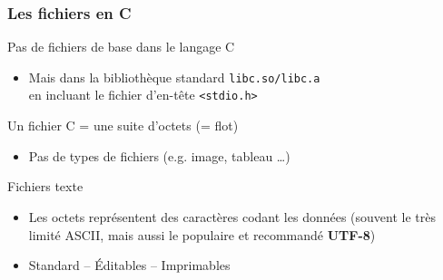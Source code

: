 \documentclass[table,handout,tikz,12pt,svgnames]{beamer}
\subtitle{\Huge Les Fichiers en C}
\date{CM5}
\begin{document}
\begin{frame}
	\titlepage
\end{frame}



\begin{frame}[fragile=singleslide]
	\frametitle{Les fichiers en C}
		\begin{block}{Pas de fichiers de base dans le langage C}
			\begin{itemize}
				\item Mais dans la bibliothèque standard \texttt{libc.so/libc.a}\\
                    en incluant le fichier d'en-tête \texttt{<stdio.h>}
			\end{itemize}
		\end{block}
		\begin{block}{Un fichier C = une suite d'octets (= flot)}
			\begin{itemize}
                \item Pas de types de fichiers (e.g. image, tableau \ldots)
			\end{itemize}
		\end{block}
		\begin{block}{Fichiers texte}
			\begin{itemize}
				\item Les octets représentent des caractères codant les données \footnotesize(souvent le très limité ASCII, mais aussi le populaire et recommandé \textbf{UTF-8})
				\small
				\item Standard -- Éditables -- Imprimables
			\end{itemize}
		\end{block}
\end{frame}
\end{document}
